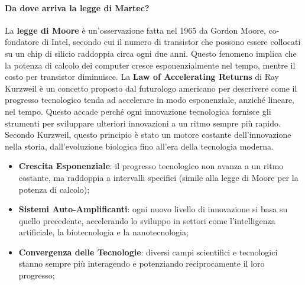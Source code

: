\paragraph{Da dove arriva la legge di Martec?}\label{par:da_dove_arriva_la_legge_di_martec} %
La \textbf{legge di Moore} è un'osservazione fatta nel 1965 da Gordon Moore, co-fondatore di Intel, secondo cui il numero di transistor che possono essere collocati su un chip di silicio raddoppia circa ogni due anni.
Questo fenomeno implica che la potenza di calcolo dei computer cresce esponenzialmente nel tempo, mentre il costo per transistor diminuisce.
\emptyln{}
La \textbf{Law of Accelerating Returns} di Ray Kurzweil è un concetto proposto dal futurologo americano per descrivere come il progresso tecnologico tenda ad accelerare in modo esponenziale, anziché lineare, nel tempo.
Questo accade perché ogni innovazione tecnologica fornisce gli strumenti per sviluppare ulteriori innovazioni a un ritmo sempre più rapido.
\\
Secondo Kurzweil, questo principio è stato un motore costante dell'innovazione nella storia, dall'evoluzione biologica fino all'era della tecnologia moderna.
\begin{itemize}
    \item \textbf{Crescita Esponenziale}: il progresso tecnologico non avanza a un ritmo costante, ma raddoppia a intervalli specifici (simile alla legge di Moore per la potenza di calcolo);
    \item \textbf{Sistemi Auto-Amplificanti}: ogni nuovo livello di innovazione si basa su quello precedente, accelerando lo sviluppo in settori come l'intelligenza artificiale, la biotecnologia e la nanotecnologia;
    \item \textbf{Convergenza delle Tecnologie}: diversi campi scientifici e tecnologici stanno sempre più interagendo e potenziando reciprocamente il loro progresso;
\end{itemize}
%
